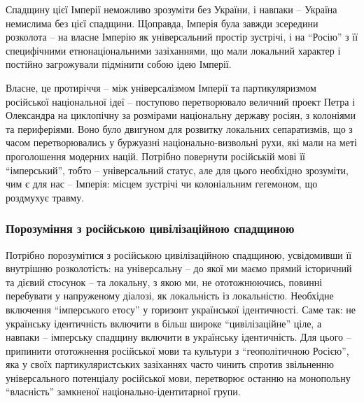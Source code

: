 Спадщину цієї Імперії неможливо зрозуміти без
України, і навпаки – Україна немислима без цієї спадщини. Щоправда, Імперія
була завжди зсередини розколота – на власне Імперію як універсальний простір
зустрічі, і на \enquote{Росію} з її специфічними етнонаціональними зазіханнями, що мали
локальний характер і постійно загрожували підмінити собою ідею Імперії. 

Власне, це протиріччя – між універсалізмом Імперії та партикуляризмом
російської національної ідеї –  поступово перетворювало величний проект Петра і
Олександра на циклопічну за розмірами національну державу росіян, з колоніями
та периферіями. Воно було двигуном для розвитку локальних сепаратизмів, що з
часом перетворювались у буржуазні національно-визвольні рухи, які мали на меті
проголошення модерних націй. Потрібно повернути російській мові її
\enquote{імперський}, тобто – універсальний статус, але для цього необхідно
зрозуміти, чим є для нас – Імперія: місцем зустрічі чи колоніальним гегемоном,
що роздмухує травму. 

\subsubsection{Порозуміння з російською цивілізаційною спадщиною}

Потрібно порозумітися з російською цивілізаційною спадщиною, усвідомивши її
внутрішню розколотість: на універсальну – до якої ми маємо прямий історичний та
дієвий стосунок – та локальну, з якою ми, не ототожнюючись, повинні перебувати
у напруженому діалозі, як локальність із локальністю. Необхідне включення
\enquote{імперського етосу} у горизонт української ідентичності. Саме так: не
українську ідентичність включити в більш широке \enquote{цивілізаційне} ціле, а
навпаки – імперську спадщину включити в українську ідентичність. Для цього –
припинити ототожнення російської мови та культури з \enquote{геополітичною
Росією}, яка у своїх партикуляристських зазіханнях часто чинить спротив
звільненню універсального потенціалу російської мови, перетворює останню на
монопольну \enquote{власність} замкненої національно-ідентитарної групи.

